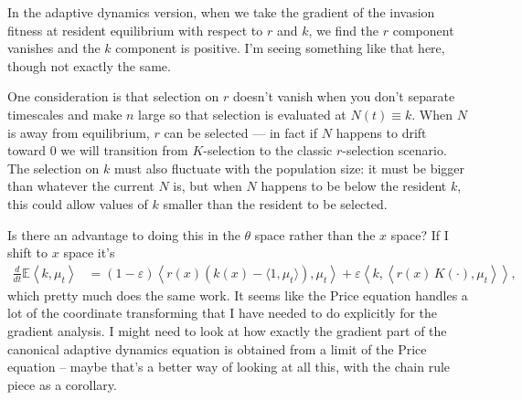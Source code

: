 \documentclass[11pt]{amsart}
\theoremstyle{remark}
\theoremstyle{definition}
\begin{document}
In the adaptive dynamics version, when we take the gradient
of the invasion fitness at resident equilibrium with respect to
$r$ and $k$, we find the $r$ component vanishes and the $k$
component is positive.
I'm seeing something like that here, though not exactly the same.

One consideration is that selection on $r$ doesn't vanish
when you don't separate timescales and make $n$ large
so that selection is evaluated at $N(t)\equiv k$.
When $N$ is away from equilibrium, $r$ can be selected ---
in fact if $N$ happens to drift toward 0 we will transition
from $K$-selection to the classic $r$-selection scenario.
The selection on $k$ must also fluctuate with the population size:
it must be bigger than whatever the current $N$ is, but
when $N$ happens to be below the resident $k$,
this could allow values of $k$ smaller than the resident to be selected.

Is there an advantage to doing this in the $\theta$ space
rather than the $x$ space?
If I shift to $x$ space it's
\begin{align*}
	\frac{d}{dt}\mathbb{E}\left\langle k, \mu_t \right\rangle
	&= (1-\varepsilon) \left\langle r(x) ( k(x) - \langle 1,\mu_t\rangle ), \mu_t \right\rangle 
		+ \varepsilon \left\langle k, \left\langle r(x)\, K(\cdot), \mu_t \right\rangle \right\rangle,
\end{align*}
which pretty much does the same work. 
It seems like the Price equation handles a lot of
the coordinate transforming that I have needed to do explicitly for the
gradient analysis.
I might need to look at how exactly the gradient part of the
canonical adaptive dynamics equation is obtained from a
limit of the Price equation -- maybe that's a better way of
looking at all this, with the chain rule piece as a corollary.

%


\vfill
\end{document}
